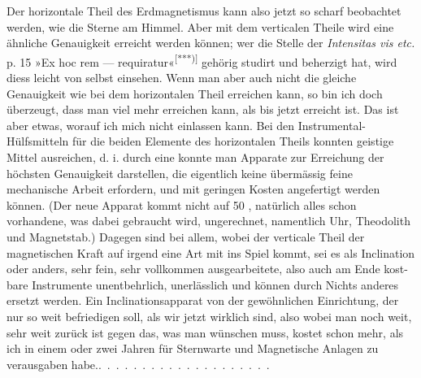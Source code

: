 Der horizontale Theil des Erdmagnetismus kann also jetzt so scharf beobachtet
werden, wie die Sterne am Himmel. Aber mit dem verticalen
Theile wird eine ähnliche Genauigkeit  erreicht werden können;
wer die Stelle der \textit{Intensitas vis etc.} p. 15 »Ex hoc rem — requiratur«\textsuperscript{[***)]} gehörig
studirt und beherzigt hat, wird diess leicht von selbst einsehen. Wenn
man aber auch nicht die gleiche Genauigkeit wie bei dem horizontalen Theil
erreichen kann, so bin ich doch überzeugt, dass man viel mehr erreichen
kann, als bis jetzt erreicht ist. Das ist aber etwas, worauf ich mich nicht
einlassen kann. Bei den Instrumental-Hülfsmitteln für die beiden Elemente
des horizontalen Theils konnten geistige Mittel ausreichen, d. i. durch eine
 konnte man Apparate zur Erreichung der höchsten
Genauigkeit darstellen, die eigentlich keine übermässig feine mechanische Arbeit
erfordern, und mit geringen Kosten angefertigt werden können. (Der
neue Apparat kommt nicht auf 50 \HistoricalCurrencyTwentySix, natürlich alles schon vorhandene, was
dabei gebraucht wird, ungerechnet, namentlich Uhr, Theodolith und Magnetstab.)
Dagegen sind bei allem, wobei der verticale Theil der magnetischen
Kraft auf irgend eine Art mit ins Spiel kommt, sei es als Inclination oder
anders, sehr fein, sehr vollkommen ausgearbeitete, also auch am Ende kost-
\begingroup\renewcommand{\thefootnote}{}\endgroup
\clearpage{}
\noindent bare Instrumente unentbehrlich, unerlässlich und können durch Nichts anderes
ersetzt werden. Ein Inclinationsapparat von der gewöhnlichen Einrichtung,
der nur so weit befriedigen soll, als wir jetzt wirklich sind, also wobei man
noch weit, sehr weit zurück ist gegen das, was man wünschen muss, kostet
schon mehr, als ich in einem oder zwei Jahren für Sternwarte und Magnetische
Anlagen  zu verausgaben habe.\quad .\ .\ .\ .\ .\ .\ .\ .\ .\ .\ .\ .\ .\ .\ .\ .\ .\ .\ .\ .

